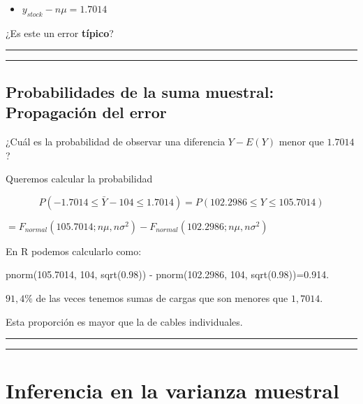 \documentclass[
]{book}
\providecommand{\tightlist}{%
  \setlength{\itemsep}{0pt}\setlength{\parskip}{0pt}}
\begin{document}
\begin{itemize}
\tightlist
\item
  \(y_{stock}-n\mu= 1.7014\)
\end{itemize}

¿Es este un error \textbf{típico}?

\begin{center}\rule{0.5\linewidth}{0.5pt}\end{center}

\begin{center}\rule{0.5\linewidth}{0.5pt}\end{center}

\hypertarget{probabilidades-de-la-suma-muestral-propagaciuxf3n-del-error}{%
\subsection{Probabilidades de la suma muestral: Propagación del error}\label{probabilidades-de-la-suma-muestral-propagaciuxf3n-del-error}}

¿Cuál es la probabilidad de observar una diferencia \(Y-E(Y)\) menor que \(1.7014\)?

Queremos calcular la probabilidad

\[P(-1.7014 \leq \bar{Y} - 104 \leq 1.7014)=P(102.2986 \leq Y \leq 105.7014)\]

\(=F_{normal}(105.7014; n\mu, n\sigma^2)-F_{normal}(102.2986; n\mu, n\sigma^2)\)

En R podemos calcularlo como:

pnorm(105.7014, 104, sqrt(0.98)) - pnorm(102.2986, 104, sqrt(0.98))=0.914.

\(91,4\%\) de las veces tenemos sumas de cargas que son menores que \(1,7014\).

Esta proporción es mayor que la de cables individuales.

\begin{center}\rule{0.5\linewidth}{0.5pt}\end{center}

\begin{center}\rule{0.5\linewidth}{0.5pt}\end{center}

\hypertarget{inferencia-en-la-varianza-muestral}{%
\section{Inferencia en la varianza muestral}\label{inferencia-en-la-varianza-muestral}}
\end{document}
